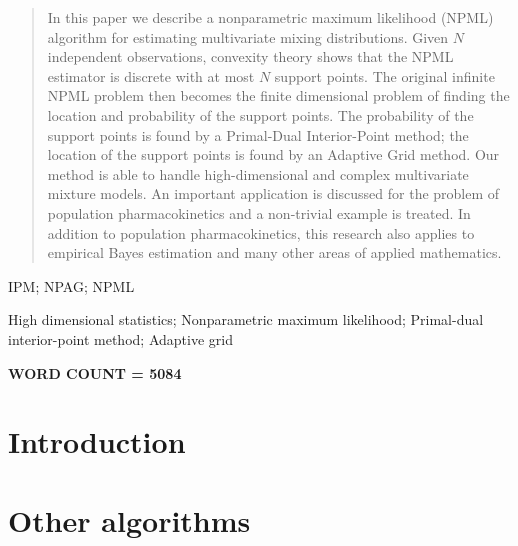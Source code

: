 \documentclass[]{interact}
\theoremstyle{plain}%
\theoremstyle{definition}
\theoremstyle{remark}
\begin{document}
\maketitle


\begin{abstract}
In this paper we describe a nonparametric maximum likelihood (NPML) algorithm for estimating multivariate mixing distributions. Given $N$ independent observations, convexity theory shows that the NPML estimator is discrete with at most $N$ support points. The original infinite NPML problem then becomes the finite dimensional problem of finding the location and probability of the support points. The probability of the support points is found by a Primal-Dual Interior-Point method; the location of the support points is found by an Adaptive Grid method. Our method is able to handle high-dimensional and complex multivariate mixture models.  An important application is discussed for the problem of population pharmacokinetics and a non-trivial example is treated. In addition to population pharmacokinetics, this research also applies to empirical Bayes estimation and many other areas of applied mathematics.
\end{abstract}

\begin{abbreviations}
IPM; NPAG; NPML
\end{abbreviations}

\begin{keywords}
High dimensional statistics;
Nonparametric maximum likelihood;
Primal-dual interior-point method;
Adaptive grid
\end{keywords}

{\bf WORD COUNT = 5084}


\section{Introduction} \label{Section:Introduction}
    
\section{Other algorithms} \label{Section:Other_algorithms}
    
\end{document}
